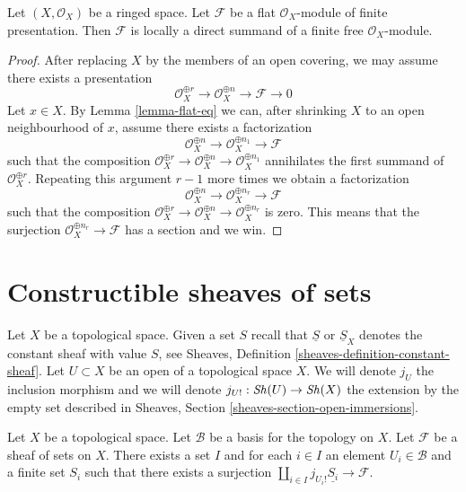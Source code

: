 \begin{lemma}
\label{lemma-flat-locally-finite-presentation}
Let $(X, \mathcal{O}_X)$ be a ringed space. Let $\mathcal{F}$ be a
flat $\mathcal{O}_X$-module of finite presentation. Then $\mathcal{F}$ is
locally a direct summand of a finite free $\mathcal{O}_X$-module.
\end{lemma}

\begin{proof}
After replacing $X$ by the members of an open covering, we may
assume there exists a presentation
$$
\mathcal{O}_X^{\oplus r} \to
\mathcal{O}_X^{\oplus n} \to \mathcal{F} \to 0
$$
Let $x \in X$. By Lemma \ref{lemma-flat-eq}
we can, after shrinking $X$ to an open
neighbourhood of $x$, assume there exists a factorization
$$
\mathcal{O}_X^{\oplus n} \to
\mathcal{O}_X^{\oplus n_1} \to \mathcal{F}
$$
such that the composition
$\mathcal{O}_X^{\oplus r} \to \mathcal{O}_X^{\oplus n} \to
\mathcal{O}_X^{\oplus n_1}$
annihilates the first summand of $\mathcal{O}_X^{\oplus r}$.
Repeating this argument $r - 1$ more times we obtain a factorization
$$
\mathcal{O}_X^{\oplus n} \to
\mathcal{O}_X^{\oplus n_r} \to \mathcal{F}
$$
such that the composition
$\mathcal{O}_X^{\oplus r} \to \mathcal{O}_X^{\oplus n}
\to \mathcal{O}_X^{\oplus n_r}$ is zero.
This means that the surjection $\mathcal{O}_X^{\oplus n_r} \to \mathcal{F}$
has a section and we win.
\end{proof}







\section{Constructible sheaves of sets}
\label{section-constructible}

\noindent
Let $X$ be a topological space. Given a set $S$ recall that $\underline{S}$
or $\underline{S}_X$ denotes the constant sheaf with value $S$, see
Sheaves, Definition \ref{sheaves-definition-constant-sheaf}.
Let $U \subset X$ be an open of a topological space $X$.
We will denote $j_U$ the inclusion morphism and we will denote
$j_{U!} : \mathop{\mathit{Sh}}\nolimits(U) \to \mathop{\mathit{Sh}}\nolimits(X)$ the extension by the empty set
described in Sheaves, Section \ref{sheaves-section-open-immersions}.

\begin{lemma}
\label{lemma-surjection}
Let $X$ be a topological space. Let $\mathcal{B}$ be a basis for the
topology on $X$. Let $\mathcal{F}$ be a sheaf of sets on $X$.
There exists a set $I$ and for each $i \in I$ an element
$U_i \in \mathcal{B}$ and a finite set $S_i$ such that there exists
a surjection $\coprod_{i \in I} j_{U_i!}\underline{S_i} \to \mathcal{F}$.
\end{lemma}

